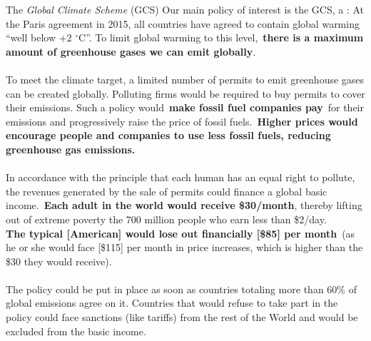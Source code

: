 \documentclass[aspectratio=169,xcolor=dvipsnames, 11pt,mathserif]{beamer}
\begin{document}
\begin{framefont}{\small}
\begin{frame}{The \textit{Global Climate Scheme} (GCS)\label{GCS_def}}
\bbvs \ip Our main policy of interest is the GCS, a :
\bbvs \ip \small{ At the Paris agreement in 2015, all countries have agreed to contain global warming ``well below +2 $\mathrm{{}^\circ}$C''. To limit global warming to this level,~\textbf{there is a maximum amount of greenhouse gases we can emit globally}.\\ \quad \\
To meet the climate target, a limited number of permits to emit greenhouse gases can be created globally. Polluting firms would be required to buy permits to cover their emissions. Such a policy would~\textbf{make fossil fuel companies pay}~for their emissions and progressively raise the price of fossil fuels.~\textbf{Higher prices would encourage people and companies to use less fossil fuels, reducing greenhouse gas emissions.}\\ \quad \\
In accordance with the principle that each human has an equal right to pollute, the revenues generated by the sale of permits could finance a global basic income.~\textbf{Each adult in the world would receive \$30/month}, thereby lifting out of extreme poverty the 700 million people who earn less than \$2/day.\\ 
\textbf{The typical [American] would lose out financially [\$85] per month}~(as he or she would face [\$115] per month in price increases, which is higher than the \$30 they would receive). \\ \quad \\
The policy could be put in place as soon as countries totaling more than 60\% of global emissions agree on it. Countries that would refuse to take part in the policy could face sanctions (like tariffs) from the rest of the World and would be excluded from the basic income.}
\ee
\ee
\end{frame}


\end{framefont}
\end{document}
